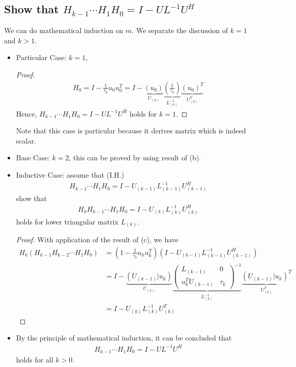 \documentclass[11pt,a4paper]{article}
\begin{document}
\subsection{Show that $H_{k-1} \cdots H_1 H_0 = I - UL^{-1} U^H$}
We can do mathematical induction on $m$. We separate the discussion of $k = 1$
and $k > 1$. 
\begin{itemize}
    \item Particular Case: $k=1$, 
        \begin{proof}
        \begin{align}
            H_0 = I - \frac{1}{\tau_0} u_0 u_0^T 
            = I - \underbrace{(u_0)}_{U_{(0)}} 
        \underbrace{(\frac{1}{\tau_0})}_{L^{-1}_{(0)}} 
        \underbrace{(u_0)^T}_{U_{(0)}^T}
        \end{align}
        Hence, $H_{k-1} \cdots H_1 H_0 = I - UL^{-1} U^H$ holds for $k=1$.
    \end{proof}
    Note that this case is particular because it derives matrix which is
    indeed scalar. 
\item Base Case: $k = 2$, this can be proved by using result of (b). 
    \item Inductive Case: assume that (I.H.)
        \begin{align}
            H_{k-1} \cdots H_1 H_0 = I - U_{(k-1)} L^{-1}_{(k-1)} U^H_{(k-1)}
        \end{align} 
        show that 
        \begin{align}
            H_k H_{k-1} \cdots H_1 H_0 = I - U_{(k)}L^{-1}_{(k)} U^H_{(k)}
        \end{align} 
        holds for lower triangular matrix $L_{(k)}$.
        \begin{proof}
            With application of the result of (c), we have
            \begin{align}
                H_k (H_{k-1} H_{k-2} \cdots H_{1} H_{0}) 
                &= (1 - \frac{1}{\tau_k} u_k u_k^T) (I - U_{(k-1)} L^{-1}_{(k-1)} U^H_{(k-1)}) \\
                &= I - \underbrace{ (U_{(k-1)} | u_k) }_{ U_{(k)} }
                \underbrace{
                \left( \begin{array}{c|c} 
                        L_{(k-1)} & 0 \\ \hline
                        u_k^T U_{(k-1)} & \tau_k
                    \end{array} \right)^{-1}
            }_{ L_{(k)}^{-1} }
                \underbrace{ (U_{(k-1)} | u_k)^{T} }_{ U_{(k)}^T } \\
                &= I - U_{(k)} L_{(k)}^{-1} U_{(k)}^T
            \end{align}
        \end{proof}
    \item By the principle of mathematical induction, it can be concluded that 
        \begin{align}
            H_{k-1} \cdots H_1 H_0 = I - UL^{-1} U^H
        \end{align}
        holds for all $k > 0$.
\end{itemize}
\end{document}
